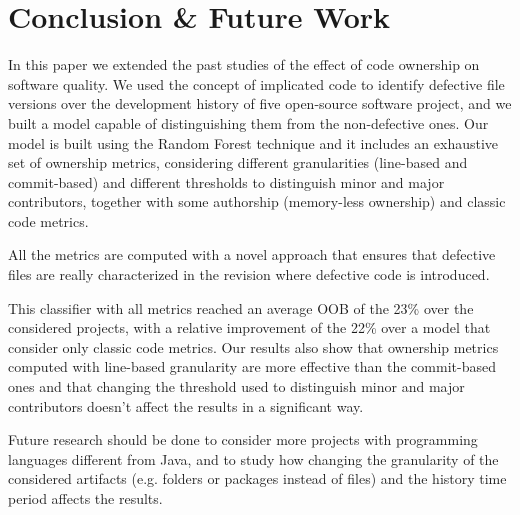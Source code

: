\section{Conclusion \& Future Work}
In this paper we extended the past studies of the effect of code ownership on software quality. We used the concept of implicated code to identify defective file versions over the development history of five open-source software project, and we built a model capable of distinguishing them from the non-defective ones. Our model is built using the Random Forest technique and it includes an exhaustive set of ownership metrics, considering different granularities (line-based and commit-based) and different thresholds to distinguish minor and major contributors, together with some authorship (memory-less ownership) and classic code metrics. 

All the metrics are computed with a novel approach that ensures that defective files are really characterized in the revision where defective code is introduced.

This classifier with all metrics reached an average OOB of the 23\% over the considered projects, with a relative improvement of the 22\% over a model that consider only classic code metrics. Our results also show that ownership metrics computed with line-based granularity are more effective than the commit-based ones and that changing the threshold used to distinguish minor and major contributors doesn't affect the results in a significant way.

Future research should be done to consider more projects with programming languages different from Java, and to study how changing the granularity of the considered artifacts (e.g. folders or packages instead of files) and the history time period affects the results.